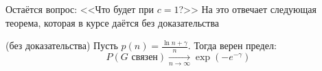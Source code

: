 \begin{note}
	Остаётся вопрос: <<Что будет при $c = 1$?>> На это отвечает следующая теорема, которая в курсе даётся без доказательства
\end{note}

\begin{theorem} (без доказательства)
	Пусть $p(n) = \frac{\ln n + \gamma}{n}$. Тогда верен предел:
	\[
		P(G \text{ связен}) \xrightarrow[n \to \infty]{} \exp(-e^{-\gamma})
	\]
\end{theorem}